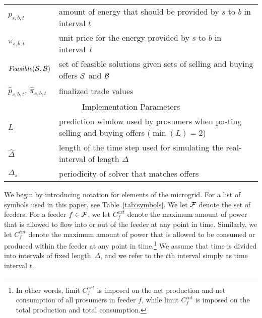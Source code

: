 \begin{table}
\begin{tabular}{|l|p{5.8cm}|}
\hline
$p_{s,b,t}$ & amount of energy that should be provided by $s$ to $b$ in interval $t$ \\
\rowcolor{TableRowGray} $\pi_{s,b,t}$ & unit price for the energy provided by $s$ to $b$ in interval~$t$ \\
$\textit{Feasible}(\mathcal{S}, \mathcal{B})$ & set of feasible solutions given sets of selling and buying offers $\mathcal{S}$ and $\mathcal{B}$ \\
\rowcolor{TableRowGray} $\hat{p}_{s,b,t}$, $\hat{\pi}_{s,b,t}$ & finalized trade values \\
\hline
\multicolumn{2}{|c|}{Implementation Parameters} \\
\hline
$L$ & prediction window used by prosumers when posting selling and buying offers ($\min(L) = 2$) \\
\rowcolor{TableRowGray} $\hat{\Delta}$ &  length of the time step used for simulating the real-interval of length $\Delta$ \\
$\Delta_s$ & periodicity of solver that matches offers \\
\hline
\end{tabular}
\end{table}

We begin by introducing notation for elements of the microgrid.
For a list of symbols used in this paper, see Table~\ref{tab:symbols}.
We let $\mathcal{F}$ denote the set of feeders.
For a feeder $f \in \mathcal{F}$, we let $C_f^{ext}$ denote the maximum amount of power that is allowed to flow into or out of the feeder at any point in time. 
Similarly, we let $C_f^{int}$ denote the maximum amount of power that is allowed to be consumed or produced within the feeder at any point in time.\footnote{In other words, limit $C_f^{ext}$ is imposed on the net production and net consumption of all prosumers in feeder $f$, while limit $C_f^{int}$ is imposed on the total production and total consumption.} 
We assume that time is divided into intervals of fixed length~$\Delta$, and we refer to the $t$th interval simply as time interval $t$.

